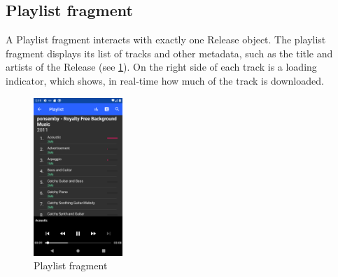 \subsection{Playlist fragment}
A Playlist fragment interacts with exactly one Release object. The playlist fragment displays its list of tracks and other metadata, such as the title and artists of the Release (see \ref{fig:screenshot-playlist}). On the right side of each track is a loading indicator, which shows, in real-time how much of the track is downloaded.
\begin{figure}
    \includegraphics[width=0.3\textwidth]{implementation/screenshot-playlist.png}
    \caption{Playlist fragment}
    \label{fig:screenshot-playlist}
\end{figure}